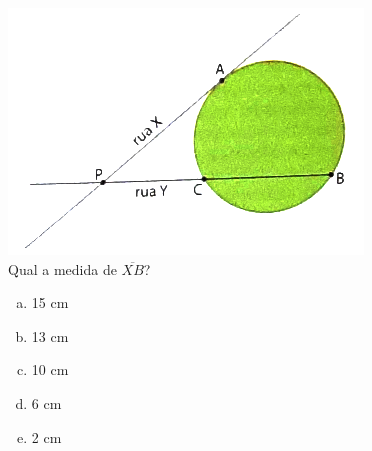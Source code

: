 \documentclass[a4paper,14pt]{article}
\begin{document}
\begin{multicols}{2}
\begin{enumerate}
    		\includegraphics[width=1\linewidth]{imagens_8FMA110/imagem6} \\
    		Qual a medida de $\overline{XB}$?
    		\begin{enumerate}[a)]
    			\item 15 cm
    			\item 13 cm
    			\item 10 cm
    			\item 6 cm
    			\item 2 cm
    		\end{enumerate}
    	\end{enumerate}
    $~$ \\ $~$ \\ $~$ \\ $~$ \\ $~$ \\ $~$ \\ $~$ \\ $~$ \\ $~$ \\ $~$ \\ $~$ \\ $~$ \\ $~$ \\ $~$ \\ $~$ \\ $~$ \\ $~$ \\ $~$ \\ $~$ \\ $~$ 
    \end{multicols}
\end{document}
